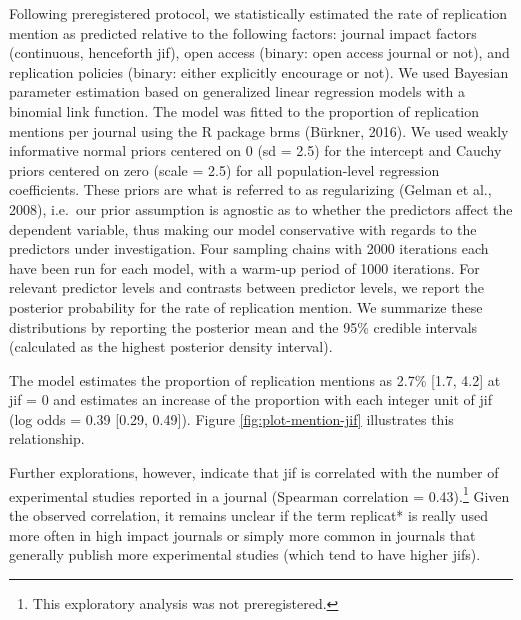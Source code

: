 \documentclass[]{elsarticle} %
\begin{document}
Following preregistered protocol, we statistically estimated the rate of replication mention as predicted relative to the following factors:
journal impact factors (continuous, henceforth jif), open access (binary: open access journal or not), and replication policies (binary: either explicitly encourage or not).
We used Bayesian parameter estimation based on generalized linear regression models with a binomial link function.
The model was fitted to the proportion of replication mentions per journal using the R package brms (Bürkner, 2016).
We used weakly informative normal priors centered on 0 (sd = 2.5) for the intercept and Cauchy priors centered on zero (scale = 2.5) for all population-level regression coefficients.
These priors are what is referred to as regularizing (Gelman et al., 2008), i.e.~our prior assumption is agnostic as to whether the predictors affect the dependent variable, thus making our model conservative with regards to the predictors under investigation.
Four sampling chains with 2000 iterations each have been run for each model, with a warm-up period of 1000 iterations.
For relevant predictor levels and contrasts between predictor levels, we report the posterior probability for the rate of replication mention.
We summarize these distributions by reporting the posterior mean and the 95\% credible intervals (calculated as the highest posterior density interval).

The model estimates the proportion of replication mentions as 2.7\% {[}1.7, 4.2{]} at jif = 0 and estimates an increase of the proportion with each integer unit of jif (log odds = 0.39 {[}0.29, 0.49{]}).
Figure \ref{fig:plot-mention-jif} illustrates this relationship.

Further explorations, however, indicate that jif is correlated with the number of experimental studies reported in a journal (Spearman correlation = 0.43).\footnote{This exploratory analysis was not preregistered.}
Given the observed correlation, it remains unclear if the term replicat* is really used more often in high impact journals or simply more common in journals that generally publish more experimental studies (which tend to have higher jifs).
\end{document}

